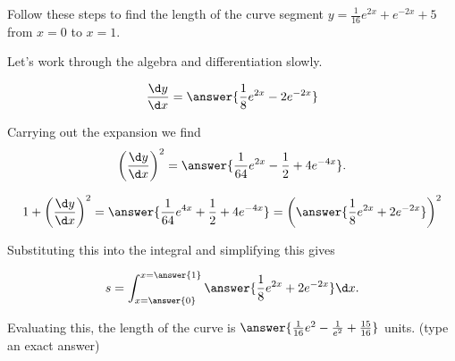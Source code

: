 \documentclass{ximera}
\author{Jim Talamo}
\begin{document}
\begin{exercise}

Follow these steps to find the length of the curve segment $y=\frac{1}{16}e^{2x}+e^{-2x}+5$ from $x=0$ to $x=1$.

Let's work through the algebra and differentiation slowly.

\[
\frac{\d y}{\d x} = \answer{\frac{1}{8}e^{2x}-2e^{-2x}}
\]

Carrying out the expansion we find
\[
\left(\frac{\d y}{\d x}\right)^2 = \answer{\frac{1}{64}e^{2x}-\frac{1}{2}+4e^{-4x}}.
\]

\begin{exercise}

\[
1+ \left(\frac{\d y}{\d x}\right)^2 = \answer{\frac{1}{64}e^{4x}+\frac{1}{2}+4e^{-4x}} = \left(\answer{\frac{1}{8}e^{2x}+2e^{-2x} }  \right)^2
\]

\begin{exercise}
Substituting this into the integral and simplifying this gives

\[
s= \int_{x=\answer{0}}^{x=\answer{1}} \answer{\frac{1}{8}e^{2x}+2e^{-2x}} \d x .
\]

Evaluating this, the length of the curve is $\answer{\frac{1}{16}e^2-\frac{1}{e^2} +\frac{15}{16} }$ units. (type an exact answer)


\end{exercise}
\end{exercise}
\end{exercise}
\end{document}
